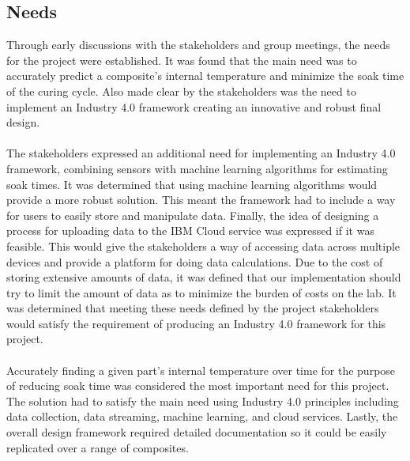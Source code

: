 \subsection{Needs}
Through early discussions with the stakeholders and group meetings, the needs for the project were established. It was found that the main need was to accurately predict a composite's internal temperature and minimize the soak time of the curing cycle. Also made clear by the stakeholders was the need to implement an Industry 4.0 framework creating an innovative and robust final design.\\\\
The stakeholders expressed an additional need for implementing an Industry 4.0 framework, combining sensors with machine learning algorithms for estimating soak times. It was determined that using machine learning algorithms would provide a more robust solution.  This meant the framework had to include a way for users to easily store and manipulate data. Finally, the idea of designing a process for uploading data to the IBM Cloud service was expressed if it was feasible. This would give the stakeholders a way of accessing data across multiple devices and provide a platform for doing data calculations. Due to the cost of storing extensive amounts of data, it was defined that our implementation should try to limit the amount of data as to minimize the burden of costs on the lab. It was determined that meeting these needs defined by the project stakeholders would satisfy the requirement of producing an Industry 4.0 framework for this project.\\\\
Accurately finding a given part’s internal temperature over time for the purpose of reducing soak time was considered the most important need for this project. The solution had to satisfy the main need using Industry 4.0 principles including data collection, data streaming, machine learning, and cloud services. Lastly, the overall design framework required detailed documentation so it could be easily replicated over a range of composites.

